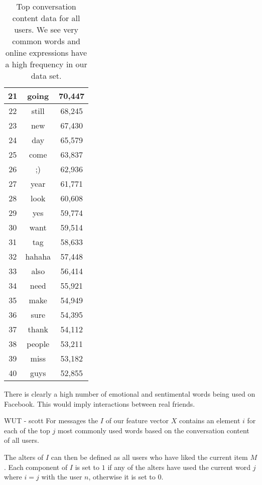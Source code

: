 \begin{table}[!htbp]
\begin{minipage}[b]{.5\textwidth}
\end{minipage}
\begin{minipage}[b]{.5\textwidth}
\centering
\begin{tabular}{|c|c|c|} %
		\hline
		21 & going & 70,447 \\ \hline
		22 & still & 68,245 \\ \hline
		23 & new & 67,430 \\ \hline
		24 & day & 65,579 \\ \hline
		25 & come & 63,837 \\ \hline
		26 & ;) & 62,936 \\ \hline
		27 & year & 61,771 \\ \hline
		28 & look & 60,608 \\ \hline
		29 & yes & 59,774 \\ \hline
		30 & want & 59,514 \\ \hline
		31 & tag & 58,633 \\ \hline
		32 & hahaha & 57,448 \\ \hline
		33 & also & 56,414 \\ \hline
		34 & need & 55,921 \\ \hline
		35 & make & 54,949 \\ \hline
		36 & sure & 54,395 \\ \hline
		37 & thank & 54,112 \\ \hline
		38 & people & 53,211 \\ \hline
		39 & miss & 53,182 \\ \hline
		40 & guys & 52,855 \\ \hline
	\end{tabular}
\end{minipage}
	\caption{Top conversation content data for all users. We see very common words and online expressions have a high frequency in
	our data set.}
	\label{tab:revpol}
\end{table}

There is clearly a high number of emotional and sentimental words being used on Facebook.
This would imply interactions between real friends.

\clearpage 

WUT - scott
For messages the $I$ of our feature vector $X$ contains an element $i$ for each of the top $j$ most commonly used words based on the conversation 
content of all users.

The alters of $I$ can then be defined as all users who have liked the current item $M$.
Each component of $I$ is set to $1$ if any of the alters have used the current word $j$ where $i = j$ with the user $n$, otherwise 
it is set to $0$.

